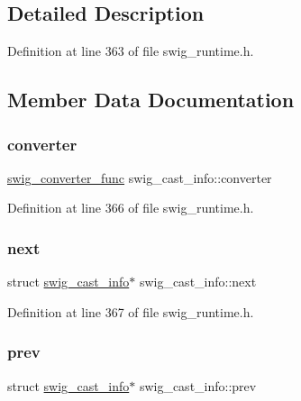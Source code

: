 \subsection{Detailed Description}


Definition at line 363 of file swig\+\_\+runtime.\+h.



\subsection{Member Data Documentation}
\mbox{\label{structswig__cast__info_aa630fddfbb1bf9c97a03f9479ba32f76}} 
\subsubsection{\texorpdfstring{converter}{converter}}
{\footnotesize\ttfamily \mbox{\hyperlink{swig__runtime_8h_a9a51597c7c2041da303a65468011f59b}{swig\+\_\+converter\+\_\+func}} swig\+\_\+cast\+\_\+info\+::converter}



Definition at line 366 of file swig\+\_\+runtime.\+h.

\mbox{\label{structswig__cast__info_ae79c6fa058a9d908bbdac14db0c9db5e}} 
\subsubsection{\texorpdfstring{next}{next}}
{\footnotesize\ttfamily struct \mbox{\hyperlink{structswig__cast__info}{swig\+\_\+cast\+\_\+info}}$\ast$ swig\+\_\+cast\+\_\+info\+::next}



Definition at line 367 of file swig\+\_\+runtime.\+h.

\mbox{\label{structswig__cast__info_afc685bcf38a5a06c6601775138c5999c}} 
\subsubsection{\texorpdfstring{prev}{prev}}
{\footnotesize\ttfamily struct \mbox{\hyperlink{structswig__cast__info}{swig\+\_\+cast\+\_\+info}}$\ast$ swig\+\_\+cast\+\_\+info\+::prev}



